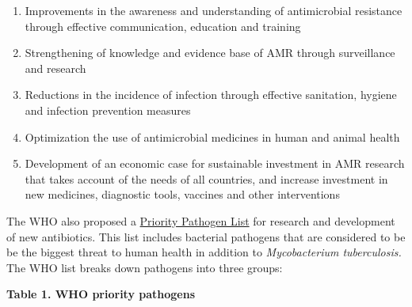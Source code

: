 \documentclass[
]{book}
\providecommand{\tightlist}{%
  \setlength{\itemsep}{0pt}\setlength{\parskip}{0pt}}
\begin{document}
\begin{enumerate}
\def\labelenumi{\arabic{enumi}.}
\tightlist
\item
  Improvements in the awareness and understanding of antimicrobial resistance through effective communication, education and training
\item
  Strengthening of knowledge and evidence base of AMR through surveillance and research
\item
  Reductions in the incidence of infection through effective sanitation, hygiene and infection prevention measures
\item
  Optimization the use of antimicrobial medicines in human and animal health
\item
  Development of an economic case for sustainable investment in AMR research that takes account of the needs of all countries, and increase investment in new medicines, diagnostic tools, vaccines and other interventions
\end{enumerate}

The WHO also proposed a \href{https://www.who.int/medicines/publications/WHO-PPL-Short_Summary_25Feb-ET_NM_WHO.pdf}{Priority Pathogen List} for research and development of new antibiotics. This list includes bacterial pathogens that are considered to be be the biggest threat to human health in addition to \emph{Mycobacterium tuberculosis.} The WHO list breaks down pathogens into three groups:

\textbf{Table 1. WHO priority pathogens}
\end{document}
